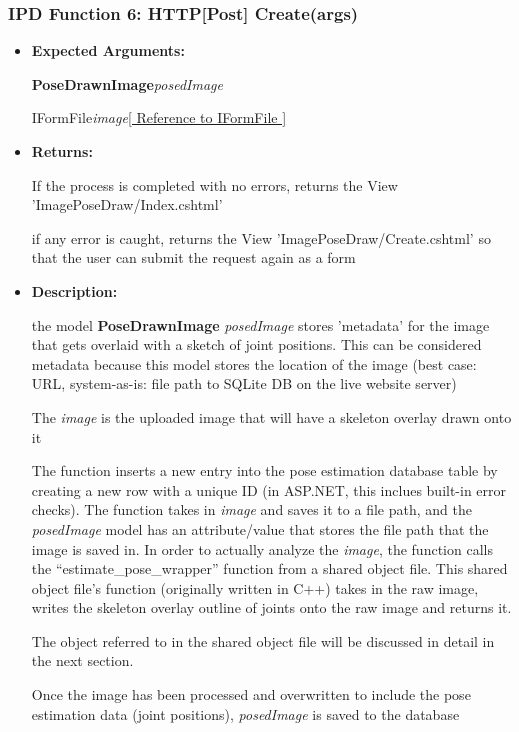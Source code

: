 \documentclass{scrreprt}
\begin{document}
\subsubsection{IPD Function 6: HTTP[Post] Create(args)}

\begin{itemize}
        \item \textbf{Expected Arguments:}

                \textbf{PoseDrawnImage}\quad\textit{posedImage}

                IFormFile\quad\textit{image}\quad\quad\quad\href{https://docs.microsoft.com/en-us/aspnet/core/api/microsoft.aspnetcore.http.iformfile}{[
                        Reference to IFormFile ]}

        \item \textbf{Returns:}

                If the process is completed with no errors, returns the View
                'ImagePoseDraw/Index.cshtml'

                if any error is caught, returns the View
                'ImagePoseDraw/Create.cshtml' so that the user can submit the
                request again as a form

        \item \textbf{Description:}

                the model \textbf{PoseDrawnImage} \textit{posedImage} stores
                'metadata' for the image that gets overlaid with a sketch of
                joint positions. This can be considered metadata because this
                model stores the location of the image (best case: URL,
                system-as-is: file path to SQLite DB on the live website
                server)

                The \textit{image} is the uploaded image that will have a
                skeleton overlay drawn onto it

                The function inserts a new entry into the pose estimation
                database table by creating a new row with a unique ID (in
                ASP.NET, this inclues built-in error checks). The function
                takes in \textit{image} and saves it to a file path, and the
                \textit{posedImage} model has an attribute/value that stores
                the file path that the image is saved in. In order to actually
                analyze the \textit{image}, the function calls the
                ``estimate\_pose\_wrapper'' function from a shared object file.
                This shared object file's function (originally written in C++)
                takes in the raw image, writes the skeleton overlay outline of
                joints onto the raw image and returns it.

                The object referred to in the shared object file will be
                discussed in detail in the next section.

                Once the image has been processed and overwritten to include
                the pose estimation data (joint positions), \textit{posedImage}
                is saved to the database
\end{itemize}
\end{document}
